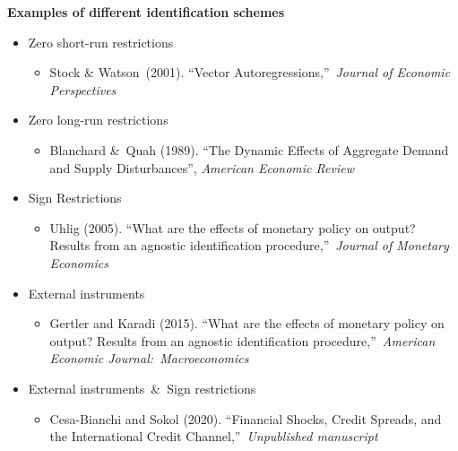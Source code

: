 \begin{frame}
{\textbf{Examples of different identification schemes}}

\begin{itemize}
\item Zero short-run restrictions

\begin{itemize}
\item Stock \& Watson\ (2001). \textquotedblleft Vector
Autoregressions,\textquotedblright\ \emph{Journal of Economic Perspectives}%
\medskip
\end{itemize}

\item Zero long-run restrictions

\begin{itemize}
\item Blanchard \&\ Quah (1989). \textquotedblleft The Dynamic Effects of
Aggregate Demand and Supply Disturbances\textquotedblright , \emph{American
Economic Review}\medskip
\end{itemize}

\item Sign Restrictions

\begin{itemize}
\item Uhlig (2005). \textquotedblleft What are the effects of monetary
policy on output? Results from an agnostic identification
procedure,\textquotedblright\ \emph{Journal of Monetary Economics}\medskip
\end{itemize}

\item External instruments

\begin{itemize}
\item Gertler and Karadi (2015). \textquotedblleft What are the effects of
monetary policy on output? Results from an agnostic identification
procedure,\textquotedblright\ \emph{American Economic Journal:\
Macroeconomics}\medskip
\end{itemize}

\item External instruments\ \&\ Sign restrictions

\begin{itemize}
\item Cesa-Bianchi and Sokol (2020). \textquotedblleft Financial Shocks,
Credit Spreads, and the International Credit Channel,\textquotedblright\ 
\emph{Unpublished manuscript}
\end{itemize}
\end{itemize}
\end{frame}

